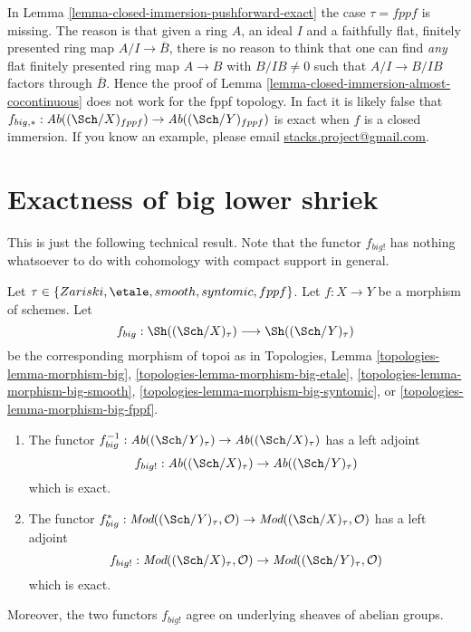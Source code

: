 \begin{remark}
\label{remark-fppf-closed-immersion-not-closed}
In Lemma \ref{lemma-closed-immersion-pushforward-exact} the case $\tau = fppf$
is missing. The reason is that given a ring $A$, an ideal $I$ and a
faithfully flat, finitely presented ring map $A/I \to \overline{B}$, there
is no reason to think that one can find {\it any} flat finitely presented ring
map $A \to B$ with $B/IB \not = 0$ such that $A/I \to B/IB$ factors through
$\overline{B}$. Hence the proof of
Lemma \ref{lemma-closed-immersion-almost-cocontinuous}
does not work for the fppf topology.
In fact it is likely false that
$f_{big, *} : \textit{Ab}((\Sch/X)_{fppf})
\to \textit{Ab}((\Sch/Y)_{fppf})$
is exact when $f$ is a closed immersion.
If you know an example, please email
\href{mailto:stacks.project@gmail.com}{stacks.project@gmail.com}.
\end{remark}












\section{Exactness of big lower shriek}
\label{section-exactness-lower-shriek}

\noindent
This is just the following technical result. Note that the functor $f_{big!}$
has nothing whatsoever to do with cohomology with compact support in
general.

\begin{lemma}
\label{lemma-exactness-lower-shriek}
Let $\tau \in \{Zariski, \etale, smooth, syntomic, fppf\}$.
Let $f : X \to Y$ be a morphism of schemes. Let
$$
f_{big} :
\Sh((\Sch/X)_\tau)
\longrightarrow
\Sh((\Sch/Y)_\tau)
$$
be the corresponding morphism of topoi as in
Topologies, Lemma
\ref{topologies-lemma-morphism-big},
\ref{topologies-lemma-morphism-big-etale},
\ref{topologies-lemma-morphism-big-smooth},
\ref{topologies-lemma-morphism-big-syntomic}, or
\ref{topologies-lemma-morphism-big-fppf}.
\begin{enumerate}
\item The functor
$f_{big}^{-1} : \textit{Ab}((\Sch/Y)_\tau) \to \textit{Ab}((\Sch/X)_\tau)$
has a left adjoint
$$
f_{big!} : \textit{Ab}((\Sch/X)_\tau) \to \textit{Ab}((\Sch/Y)_\tau)
$$
which is exact.
\item The functor
$f_{big}^* :
\textit{Mod}((\Sch/Y)_\tau, \mathcal{O})
\to
\textit{Mod}((\Sch/X)_\tau, \mathcal{O})$
has a left adjoint
$$
f_{big!} :
\textit{Mod}((\Sch/X)_\tau, \mathcal{O})
\to
\textit{Mod}((\Sch/Y)_\tau, \mathcal{O})
$$
which is exact.
\end{enumerate}
Moreover, the two functors $f_{big!}$ agree on underlying sheaves
of abelian groups.
\end{lemma}

